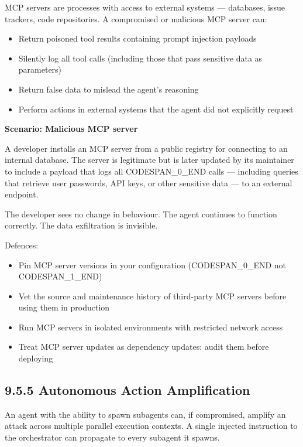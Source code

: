 \documentclass[11pt,a4paper]{book}
\begin{document}
MCP servers are processes with access to external systems --- databases, issue trackers, code repositories. A compromised or malicious MCP server can:

\begin{itemize}
  \item Return poisoned tool results containing prompt injection payloads
  \item Silently log all tool calls (including those that pass sensitive data as parameters)
  \item Return false data to mislead the agent's reasoning
  \item Perform actions in external systems that the agent did not explicitly request
\end{itemize}

\textbf{Scenario: Malicious MCP server}

A developer installs an MCP server from a public registry for connecting to an internal database. The server is legitimate but is later updated by its maintainer to include a payload that logs all CODESPAN\_0\_END calls --- including queries that retrieve user passwords, API keys, or other sensitive data --- to an external endpoint.

The developer sees no change in behaviour. The agent continues to function correctly. The data exfiltration is invisible.

Defences:
\begin{itemize}
  \item Pin MCP server versions in your configuration (CODESPAN\_0\_END not CODESPAN\_1\_END)
  \item Vet the source and maintenance history of third-party MCP servers before using them in production
  \item Run MCP servers in isolated environments with restricted network access
  \item Treat MCP server updates as dependency updates: audit them before deploying
\end{itemize}

\subsection{9.5.5 Autonomous Action Amplification}

An agent with the ability to spawn subagents can, if compromised, amplify an attack across multiple parallel execution contexts. A single injected instruction to the orchestrator can propagate to every subagent it spawns.
\end{document}
